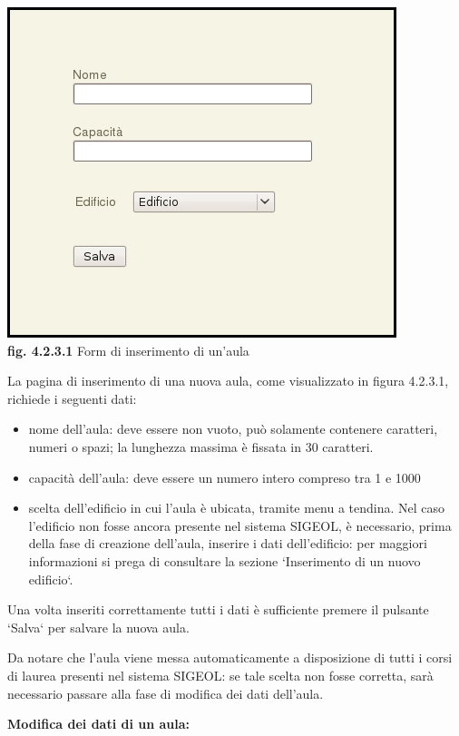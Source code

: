 \documentclass[11pt,a4paper]{article}
\begin{document}
\begin{center}
	\includegraphics[scale=0.5]{images/nuova_aula.jpg}\\
	\textbf{fig. 4.2.3.1} Form di inserimento di un'aula\\
\end{center}

La pagina di inserimento di una nuova aula, come visualizzato in figura 4.2.3.1, richiede i seguenti dati:
\begin{itemize}
 \item nome dell'aula: deve essere non vuoto, può solamente contenere caratteri, numeri o spazi; la lunghezza massima è fissata in 30 caratteri. 
 \item capacità dell'aula: deve essere un numero intero compreso tra 1 e 1000
 \item scelta dell'edificio in cui l'aula è ubicata, tramite menu a tendina. Nel caso l'edificio non fosse ancora presente nel sistema SIGEOL, è necessario, prima della fase di creazione dell'aula, inserire i dati dell'edificio: per maggiori informazioni si prega di consultare la sezione `Inserimento di un nuovo edificio`.
\end{itemize}
Una volta inseriti correttamente tutti i dati è sufficiente premere il pulsante `Salva` per salvare la nuova aula.

Da notare che l'aula viene messa automaticamente a disposizione di tutti i corsi di laurea presenti nel sistema SIGEOL: se tale scelta non fosse corretta, sarà necessario passare alla fase di modifica dei dati dell'aula.
\newpage
\begin{large}\textbf{Modifica dei dati di un aula:}\end{large}
\end{document}
